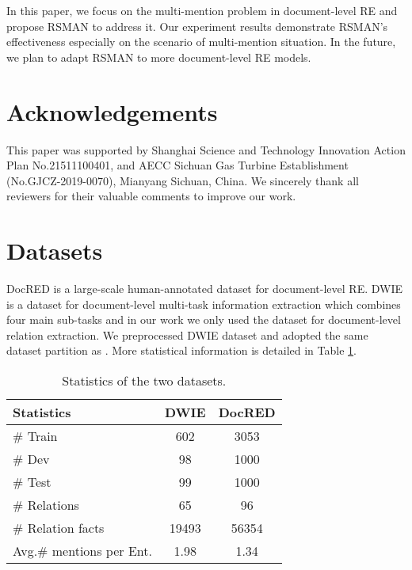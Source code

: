 \documentclass[11pt]{article}
\begin{document}
In this paper, we focus on the multi-mention problem in document-level RE and propose RSMAN to address it. Our experiment results
demonstrate RSMAN's effectiveness especially on the scenario of multi-mention situation. In the future, we plan to adapt RSMAN to more document-level RE models.

\section*{Acknowledgements}
This paper was supported by Shanghai Science and Technology Innovation Action Plan No.21511100401, and AECC Sichuan Gas Turbine Establishment (No.GJCZ-2019-0070), Mianyang Sichuan, China. We sincerely thank all reviewers for their valuable comments to improve our work.





\appendix
\section{Datasets}\label{sec:data}
DocRED is a large-scale human-annotated dataset for document-level RE. DWIE is a dataset for document-level multi-task information extraction which combines four main sub-tasks and in our work we only used the dataset for document-level relation extraction. 
We preprocessed DWIE dataset and adopted the same dataset partition as \cite{ru-etal-2021-learning}. More statistical information is detailed in Table \ref{tab:statistics}.
\begin{table}[htbp]
  \centering
    \begin{tabular}{lcc}
    \toprule
    Statistics & \multicolumn{1}{l}{DWIE} & \multicolumn{1}{l}{ DocRED} \\
    \midrule
    \# Train & 602   & 3053 \\
    \# Dev & 98    & 1000 \\
    \# Test & 99    & 1000 \\
    \# Relations & 65    & 96 \\
    \# Relation facts & 19493 & 56354 \\
    Avg.\# mentions per Ent. & 1.98  & 1.34 \\
    \bottomrule
    \end{tabular}\caption{Statistics of the two datasets.}
  \label{tab:statistics}\end{table}
\end{document}
